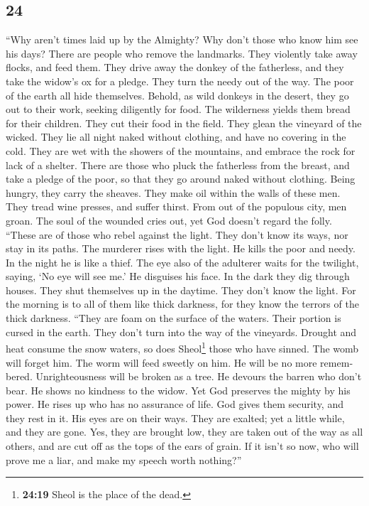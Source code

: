 \begin{paracol}{2}
\switchcolumn
\begin{otherlanguage}{english}

\hypertarget{section-47}{%
\section{24}\label{section-47}}

 ``Why aren't times laid up by the Almighty? Why don't
those who know him see his days?  There are people who
remove the landmarks. They violently take away flocks, and feed them.
 They drive away the donkey of the fatherless, and they
take the widow's ox for a pledge.  They turn the needy out
of the way. The poor of the earth all hide themselves. 
Behold, as wild donkeys in the desert, they go out to their work,
seeking diligently for food. The wilderness yields them bread for their
children.  They cut their food in the field. They glean
the vineyard of the wicked.  They lie all night naked
without clothing, and have no covering in the cold.  They
are wet with the showers of the mountains, and embrace the rock for lack
of a shelter.  There are those who pluck the fatherless
from the breast, and take a pledge of the poor,  so that
they go around naked without clothing. Being hungry, they carry the
sheaves.  They make oil within the walls of these men.
They tread wine presses, and suffer thirst.  From out of
the populous city, men groan. The soul of the wounded cries out, yet God
doesn't regard the folly.  ``These are of those who rebel
against the light. They don't know its ways, nor stay in its paths.
 The murderer rises with the light. He kills the poor and
needy. In the night he is like a thief.  The eye also of
the adulterer waits for the twilight, saying, `No eye will see me.' He
disguises his face.  In the dark they dig through houses.
They shut themselves up in the daytime. They don't know the light.
 For the morning is to all of them like thick darkness,
for they know the terrors of the thick darkness.  ``They
are foam on the surface of the waters. Their portion is cursed in the
earth. They don't turn into the way of the vineyards. 
Drought and heat consume the snow waters, so does Sheol\footnote{\textbf{24:19}
  Sheol is the place of the dead.} those who have sinned.
 The womb will forget him. The worm will feed sweetly on
him. He will be no more remembered. Unrighteousness will be broken as a
tree.  He devours the barren who don't bear. He shows no
kindness to the widow.  Yet God preserves the mighty by
his power. He rises up who has no assurance of life.  God
gives them security, and they rest in it. His eyes are on their ways.
 They are exalted; yet a little while, and they are gone.
Yes, they are brought low, they are taken out of the way as all others,
and are cut off as the tops of the ears of grain.  If it
isn't so now, who will prove me a liar, and make my speech worth
nothing?''


\end{otherlanguage}
\end{paracol}
